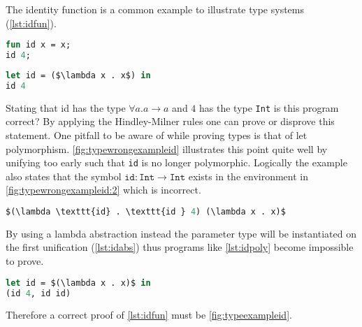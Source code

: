 \documentclass[11pt,oneside,a4paper]{report}
\begin{document}
\begin{exmp}
\label{exmp:letpoly}
The identity function is a common example to illustrate type systems (\autoref{lst:idfun}).
\begin{lstlisting}[language=ML,caption={Identity function in $L$},label={lst:idfun}]
fun id x = x;
id 4;
\end{lstlisting}
\begin{lstlisting}[language=ML,caption={Identity function in lambda calculus with let},label={lst:idfun},mathescape=true]
let id = ($\lambda x . x$) in
id 4
\end{lstlisting}
Stating that id has the type $\forall a.a \rightarrow a$ and $4$ has the type \texttt{Int} is this program correct?
By applying the Hindley-Milner rules one can prove or disprove this statement.
One pitfall to be aware of while proving types is that of let polymorphism.
\autoref{fig:typewrongexampleid} illustrates this point quite well by unifying too early such that \texttt{id} is no longer polymorphic.
Logically the example also states that the symbol $\texttt{id}: \texttt{Int} \rightarrow \texttt{Int}$ exists in the environment in \autoref{fig:typewrongexampleid:2} which is incorrect.
\begin{lstlisting}[language=ML,caption={Identity as lambda abstraction},label={lst:idabs},mathescape=true]
$(\lambda \texttt{id} . \texttt{id } 4) (\lambda x . x)$
\end{lstlisting}
By using a lambda abstraction instead the parameter type will be instantiated on the first unification (\autoref{lst:idabs}) thus programs like \autoref{lst:idpoly} become impossible to prove.
\begin{lstlisting}[language=ML,caption={Identity in let polymorphism},label={lst:idpoly},mathescape=true]
let id = $(\lambda x . x)$ in
(id 4, id id)
\end{lstlisting}
Therefore a correct proof of \autoref{lst:idfun} must be \autoref{fig:typeexampleid}.
\begin{figure}[ht]
    \begin{mdframed}[style=bigbox]
        \begin{subfigure}[b]{1\textwidth}
        \begin{prooftree}

\end{prooftree}
\end{subfigure}
\end{mdframed}
\end{figure}
\end{exmp}
\end{document}
